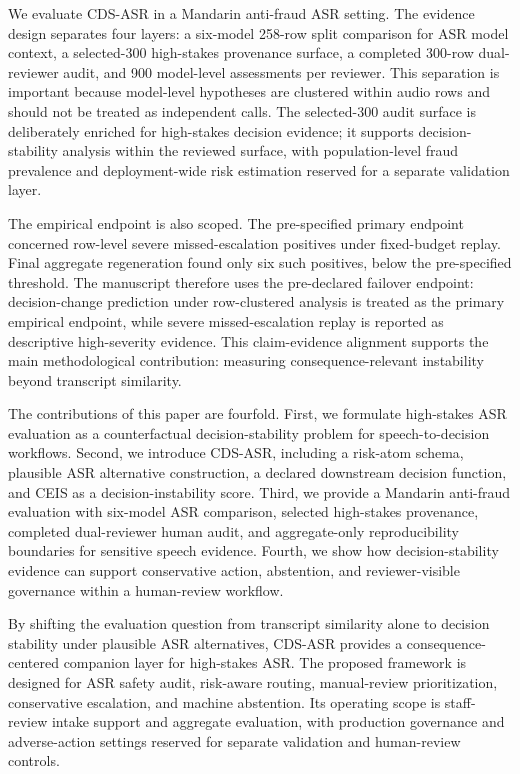 \documentclass[
]{article}
\begin{document}
We evaluate CDS-ASR in a Mandarin anti-fraud ASR setting. The evidence
design separates four layers: a six-model 258-row split comparison for
ASR model context, a selected-300 high-stakes provenance surface, a
completed 300-row dual-reviewer audit, and 900 model-level assessments
per reviewer. This separation is important because model-level
hypotheses are clustered within audio rows and should not be treated as
independent calls. The selected-300 audit surface is deliberately
enriched for high-stakes decision evidence; it supports
decision-stability analysis within the reviewed surface, with
population-level fraud prevalence and deployment-wide risk estimation
reserved for a separate validation layer.

The empirical endpoint is also scoped. The pre-specified primary
endpoint concerned row-level severe missed-escalation positives under
fixed-budget replay. Final aggregate regeneration found only six such
positives, below the pre-specified threshold. The manuscript therefore
uses the pre-declared failover endpoint: decision-change prediction
under row-clustered analysis is treated as the primary empirical
endpoint, while severe missed-escalation replay is reported as
descriptive high-severity evidence. This claim-evidence alignment
supports the main methodological contribution: measuring
consequence-relevant instability beyond transcript similarity.

The contributions of this paper are fourfold. First, we formulate
high-stakes ASR evaluation as a counterfactual decision-stability
problem for speech-to-decision workflows. Second, we introduce CDS-ASR,
including a risk-atom schema, plausible ASR alternative construction, a
declared downstream decision function, and CEIS as a
decision-instability score. Third, we provide a Mandarin anti-fraud
evaluation with six-model ASR comparison, selected high-stakes
provenance, completed dual-reviewer human audit, and aggregate-only
reproducibility boundaries for sensitive speech evidence. Fourth, we
show how decision-stability evidence can support conservative action,
abstention, and reviewer-visible governance within a human-review
workflow.

By shifting the evaluation question from transcript similarity alone to
decision stability under plausible ASR alternatives, CDS-ASR provides a
consequence-centered companion layer for high-stakes ASR. The proposed
framework is designed for ASR safety audit, risk-aware routing,
manual-review prioritization, conservative escalation, and machine
abstention. Its operating scope is staff-review intake support and
aggregate evaluation, with production governance and adverse-action
settings reserved for separate validation and human-review controls.
\end{document}
